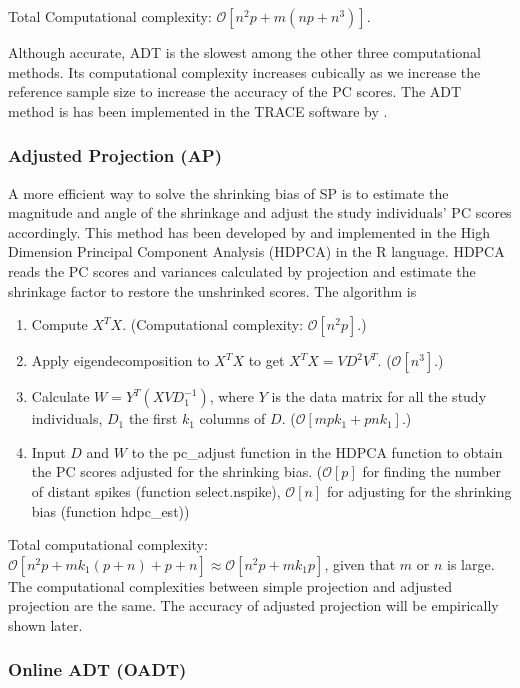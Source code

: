 \documentclass{article}
\newcommand{\bO}{\mathcal{O}}
\begin{document}
Total Computational complexity: $\bO[n^2p + m(np + n^3)]$.

Although accurate, ADT is the slowest among the other three computational
methods.
Its computational complexity increases cubically as we increase the reference sample size to increase the accuracy of the PC scores.
The ADT method is has been implemented in the TRACE software by \cite{wang}.


\subsubsection{Adjusted Projection (AP)}

A more efficient way to solve the shrinking bias of SP is to estimate the
magnitude and angle of the shrinkage and adjust the study individuals' PC scores accordingly.
This method has been developed by \cite{dey} and implemented in the High
Dimension Principal Component Analysis (HDPCA) in the R language.
HDPCA reads the PC scores and variances calculated by projection and estimate the shrinkage factor to restore the unshrinked scores. 
The algorithm is
\begin{enumerate}
\item Compute $X^T X$.
  (Computational complexity: $\bO[n^2p]$.)  
\item Apply eigendecomposition to $X^T X$ to get $X^T X = V D^2 V^T$.
  ($\bO[n^3]$.)
\item Calculate $W = Y^T (X V D_1^{-1})$, where $Y$ is the data matrix for all the study individuals, $D_1$ the first $k_1$ columns of $D$. ($\bO[mpk_1 + pnk_1]$.)
  \item Input $D$ and $W$ to the pc\_adjust function in the HDPCA function to obtain the PC scores adjusted for the shrinking bias. ($\bO[p]$ for finding the number of distant spikes (function select.nspike), $\bO[n]$ for adjusting for the shrinking bias (function hdpc\_est))
\end{enumerate}

Total computational complexity: $\bO[n^2p + mk_1(p + n) + p + n] \approx \bO[n^2p + mk_1p]$,
given that $m$ or $n$ is large. The computational complexities between simple projection and adjusted projection are the same.
The accuracy of adjusted projection will be empirically shown later.

\subsubsection{Online ADT (OADT)}
\end{document}
